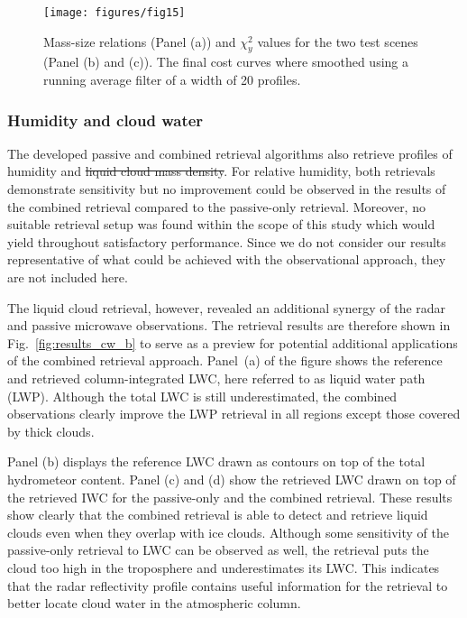 \documentclass[journal abbreviation, manuscript]{copernicus}
\providecommand{\DIFadd}[1]{{\protect\color{blue}\uwave{#1}}} %
\providecommand{\DIFdel}[1]{{\protect\color{red}\sout{#1}}}                      %
\providecommand{\DIFaddbegin}{} %
\providecommand{\DIFaddend}{} %
\providecommand{\DIFdelbegin}{} %
\providecommand{\DIFdelend}{} %
\begin{document}
\begin{figure}[!h]
\centering
\texttt{[image: figures/fig15]}
\caption{Mass-size relations (Panel (a)) and $\chi^2_y$ values for the two test
  scenes (Panel (b) and (c)). The final cost curves where smoothed using a
  running average filter of a width of 20 profiles.}
\label{fig:costs}
\end{figure}


\subsubsection{Humidity and cloud water}

The developed passive and combined retrieval algorithms also retrieve profiles
of humidity and \DIFdelbegin \DIFdel{liquid cloud mass density}\DIFdelend \DIFaddbegin \DIFadd{LCWC}\DIFaddend . For relative humidity, both retrievals demonstrate
sensitivity but no improvement could be observed in the results of the combined
retrieval compared to the passive-only retrieval. Moreover, no suitable
retrieval setup was found within the scope of this study which would yield
throughout satisfactory performance. Since we do not consider our results
representative of what could be achieved with the observational approach, they
are not included here.

The liquid cloud retrieval, however, revealed an additional synergy of the radar
and passive microwave observations. The retrieval results are therefore shown in
Fig.~\ref{fig:results_cw_b} to serve as a preview for potential additional
applications of the combined retrieval approach. Panel~(a) of the figure shows
the reference and retrieved column-integrated LWC, here referred to as liquid
water path (LWP). Although the total LWC is still underestimated, the combined
observations clearly improve the LWP retrieval in all regions except those covered
by thick clouds.

Panel (b) displays the reference LWC drawn as contours on top of the total
hydrometeor content. Panel (c) and (d) show the retrieved LWC drawn on top of
the retrieved IWC for the passive-only and the combined retrieval. These results
show clearly that the combined retrieval is able to detect and retrieve liquid
clouds even when they overlap with ice clouds. Although some sensitivity of the
passive-only retrieval to LWC can be observed as well, the retrieval puts the
cloud too high in the troposphere and underestimates its LWC. This indicates
that the radar reflectivity profile contains useful information for the
retrieval to better locate cloud water in the atmospheric column.
\end{document}
